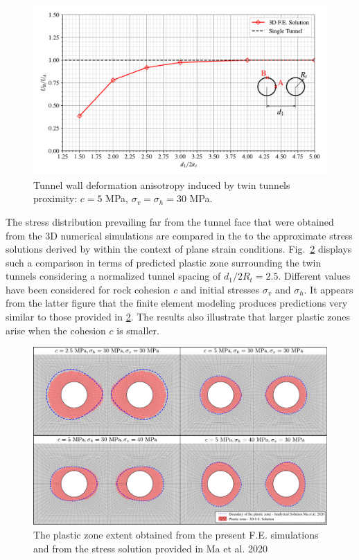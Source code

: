 \documentclass[Journal,letterpaper, NoLists,SectionNumbers]{ascelike-new}
\begin{document}
\begin{figure}[h!]
	\centering
	\includegraphics[scale=0.65]{MA_Relationship between Convergence in B and A.pdf}
	\caption{Tunnel wall deformation anisotropy induced by twin tunnels proximity: $c=5$ MPa, $\sigma_v = \sigma_h = 30$ MPa.}
	\label{MA_Relationship between convergence in B and A}
\end{figure}

The stress distribution prevailing far from the tunnel face that were obtained from the 3D numerical simulations are compared in the to the approximate stress solutions derived by  within the context of plane strain conditions. Fig.~\ref{MA_FIG1} displays such a comparison in terms of predicted plastic zone surrounding the twin tunnels considering a normalized tunnel spacing of $d_1/2R_t = 2.5$.  Different values have been considered for rock cohesion $c$ and initial stresses $\sigma_v$ and $\sigma_h$. It appears from the latter figure that the finite element modeling produces predictions very similar to those provided in \ref{MA_FIG1}. The results also illustrate that larger plastic zones arise when the cohesion $c$ is smaller.

\begin{figure}[h!]
	\centering
	\includegraphics[scale=0.7]{MA_Comparisions_plastic_zones.pdf}
	\caption{The plastic zone extent obtained from the present F.E. simulations and from the stress solution provided in Ma et al. 2020}
	\label{MA_FIG1}
\end{figure}
\end{document}
